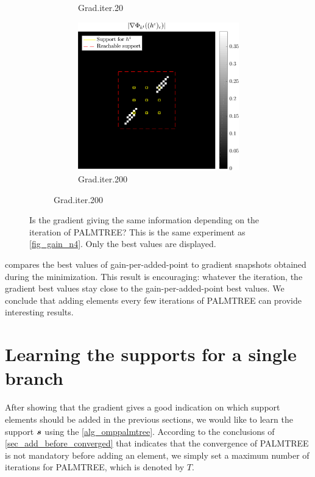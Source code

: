 \begin{figure}[!ht]
\begin{subfigure}[b]{0.49\linewidth}
\begin{subfigure}[b]{0.49\linewidth}
	\caption{Grad.\@ iter.\@ 20}
	\end{subfigure}
	\begin{subfigure}[b]{0.49\linewidth}\centering
	\includegraphics[width=\linewidth]{figures/xp_grad_iterations/xp_128x128_sc2_angl1_K3_S3_node4_iter200_partgrad4_bestvalues.pdf}
	\caption{Grad.\@ iter.\@ 200}
	\end{subfigure}
\end{subfigure}
\caption{Is the gradient giving the same information depending on the iteration of \ac{PALMTREE}? This is the same experiment as \cref{fig_gain_n4}. Only the best values are displayed.}\label{fig_iter_gain_vs_grad}
\end{figure}

\noindent
{} compares the best values of gain-per-added-point to gradient snapshots obtained during the minimization. This result is encouraging: whatever the iteration, the gradient best values stay close to the gain-per-added-point best values. We conclude that adding elements every few iterations of \ac{PALMTREE} can provide interesting results.

\FloatBarrier
\section{Learning the supports for a single branch}

After showing that the gradient gives a good indication on which support elements should be added in the previous sections, we would like to learn the support $\bm{s}$ using the \cref{alg_omppalmtree}. According to the conclusions of \cref{sec_add_before_converged} that indicates that the convergence of \ac{PALMTREE} is not mandatory before adding an element, we simply set a maximum number of iterations for \ac{PALMTREE}, which is denoted by $T$.

